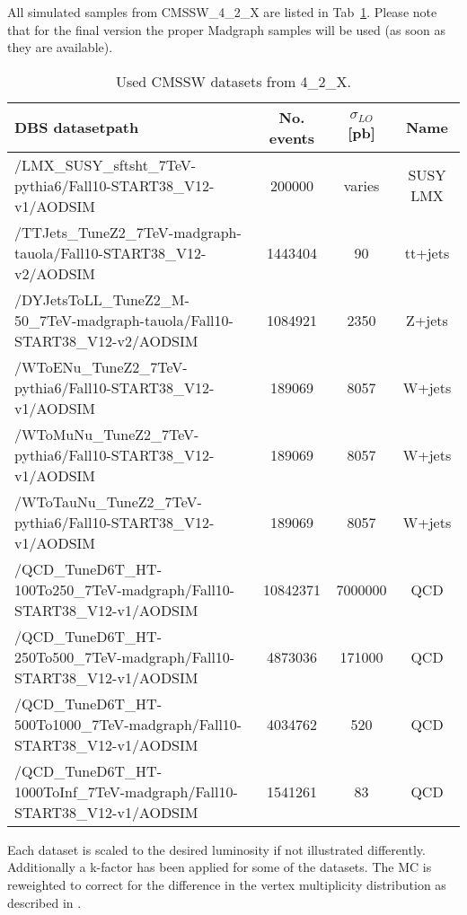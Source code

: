 All simulated samples from CMSSW\_4\_2\_X are listed in Tab~\ref{tab:alldataset}. 
Please note that for the
final version the proper Madgraph samples will be used (as soon as they are 
available).
 
\begin{table}[htdp]
\caption{Used CMSSW datasets from 4\_2\_X.}
\label{tab:alldataset}
\begin{center}
\begin{tabular}{|l||c||c||c|} \hline
 	DBS datasetpath 	&	No. events 		&   $\sigma_{LO}$ [pb] & Name\\ \hline \hline
/LMX\_SUSY\_sftsht\_7TeV-pythia6/Fall10-START38\_V12-v1/AODSIM & 200000 & varies & SUSY LMX\\ \hline
/TTJets\_TuneZ2\_7TeV-madgraph-tauola/Fall10-START38\_V12-v2/AODSIM& 1443404 & 90& tt+jets\\ \hline
/DYJetsToLL\_TuneZ2\_M-50\_7TeV-madgraph-tauola/Fall10-START38\_V12-v2/AODSIM & 1084921 & 2350& Z+jets\\ \hline
/WToENu\_TuneZ2\_7TeV-pythia6/Fall10-START38\_V12-v1/AODSIM & 189069 & 8057& W+jets\\ \hline
/WToMuNu\_TuneZ2\_7TeV-pythia6/Fall10-START38\_V12-v1/AODSIM & 189069 & 8057& W+jets\\ \hline
/WToTauNu\_TuneZ2\_7TeV-pythia6/Fall10-START38\_V12-v1/AODSIM & 189069 & 8057& W+jets\\ \hline
/QCD\_TuneD6T\_HT-100To250\_7TeV-madgraph/Fall10-START38\_V12-v1/AODSIM & 10842371 & 7000000 & QCD\\ \hline
/QCD\_TuneD6T\_HT-250To500\_7TeV-madgraph/Fall10-START38\_V12-v1/AODSIM & 4873036 & 171000 & QCD\\ \hline
/QCD\_TuneD6T\_HT-500To1000\_7TeV-madgraph/Fall10-START38\_V12-v1/AODSIM & 4034762 & 520& QCD\\ \hline
/QCD\_TuneD6T\_HT-1000ToInf\_7TeV-madgraph/Fall10-START38\_V12-v1/AODSIM & 1541261 & 83 & QCD\\ \hline
\end{tabular}
\end{center}
\end{table}

Each dataset is scaled to the desired luminosity if not illustrated differently. 
Additionally a k-factor has been applied for some of the datasets.
The MC is reweighted to correct for the difference in the vertex
multiplicity distribution as described in \cite{pileup}.

